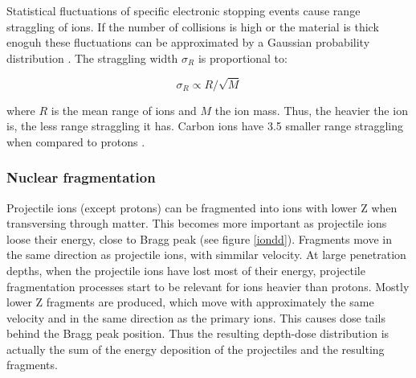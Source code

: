 \documentclass[type=dr, dr=rernat, accentcolor=tud7b,colorbacktitle, bigchapter, openright, twoside, 12pt ]{tudthesis}
\begin{document}
Statistical fluctuations of specific electronic stopping events cause range straggling of ions. If the number of collisions is high or the material is thick enoguh these fluctuations can be approximated by
a Gaussian probability distribution \cite{Bohr1940, Ahlen1980}. The straggling width $\sigma_R$ is proportional to:

\begin{equation}
 \sigma_R \propto R/\sqrt{M}
\end{equation}

where $R$ is the mean range of ions and $M$ the ion mass. Thus, the heavier the ion is, the less range straggling it has. Carbon ions have 3.5 smaller range straggling when compared to protons \cite{Schardt2010}.

\subsubsection{Nuclear fragmentation}
\label{nuclfrag}

Projectile ions (except protons) can be fragmented into ions with lower Z when transversing through matter. This becomes more important as projectile ions loose their energy, close to Bragg peak (see figure \ref{iondd}).
Fragments move in the same direction as projectile ions, with simmilar velocity. 
At large penetration depths, when the projectile ions have lost most of their energy, projectile fragmentation processes start to be 
relevant for ions heavier than protons. Mostly lower Z fragments are produced, which move with approximately the same velocity 
and in the same direction as the primary ions. This causes dose tails behind the Bragg peak position. Thus the resulting depth-dose 
distribution is actually the sum of the energy deposition of the projectiles and the resulting 
fragments. 
\end{document}
